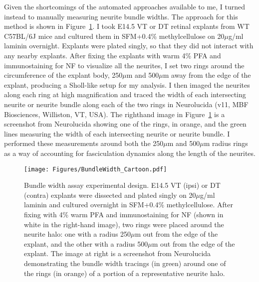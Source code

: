Given the shortcomings of the automated approaches available to me, I turned instead to manually measuring neurite bundle widths.
The approach for this method is shown in Figure~\ref{Figures/BundleWidthCartoon}.
I took E14.5 VT or DT retinal explants from WT C57BL/6J mice and cultured them in SFM+0.4\% methylcellulose on 20$\mu$g/ml laminin overnight.
Explants were plated singly, so that they did not interact with any nearby explants.
After fixing the explants with warm 4\% PFA and immunostaining for NF to visualize all the neurites, I set two rings around the circumference of the explant body, 250$\mu$m and 500$\mu$m away from the edge of the explant, producing a Sholl-like setup for my analysis.
I then imaged the neurites along each ring at high magnification and traced the width of each intersecting neurite or neurite bundle along each of the two rings in Neurolucida (v11, MBF Biosciences, Williston, VT, USA).
The righthand image in Figure~\ref{Figures/BundleWidthCartoon} is a screenshot from Neurolucida showing one of the rings, in orange, and the green lines measuring the width of each intersecting neurite or neurite bundle.
I performed these measurements around both the 250$\mu$m and 500$\mu$m radius rings as a way of accounting for fasciculation dynamics along the length of the neurites.
\begin{figure}[hbtp]
    \begin{center}
        \texttt{[image: Figures/BundleWidth\_Cartoon.pdf]}
        \caption[Bundle width assay experimental design.]
        {Bundle width assay experimental design.
        E14.5 VT (ipsi) or DT (contra) explants were dissected and plated singly on 20$\mu$g/ml laminin and cultured overnight in SFM+0.4\% methylcellulose.
        After fixing with 4\% warm PFA and immunostaining for NF (shown in white in the right-hand image), two rings were placed around the neurite halo: one with a radius 250$\mu$m out from the edge of the explant, and the other with a radius 500$\mu$m out from the edge of the explant.
        The image at right is a screenshot from Neurolucida demonstrating the bundle width tracings (in green) around one of the rings (in orange) of a portion of a representative neurite halo.
        }
        \label{Figures/BundleWidthCartoon}
    \end{center}
\end{figure}

